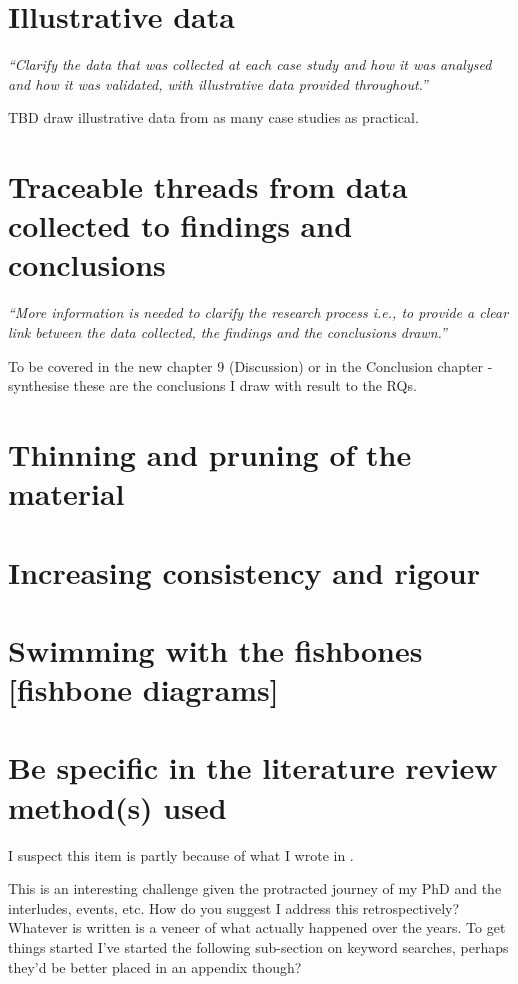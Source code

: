 \section{Illustrative data}
\emph{``Clarify the data that was collected at each case study and how it was analysed and how it was validated, with illustrative data provided throughout.''}

TBD draw illustrative data from as many case studies as practical.

\section{Traceable threads from data collected to findings and conclusions}
\emph{``More information is needed to clarify the research process i.e., to provide a clear link between the data collected, the findings and the conclusions drawn.''}

To be covered in the new chapter 9 (Discussion) or in the Conclusion chapter - synthesise these are the conclusions I draw with result to the RQs.

\section{Thinning and pruning of the material}

\section{Increasing consistency and rigour}

\section{Swimming with the fishbones [fishbone diagrams]}

\section{Be specific in the literature review method(s) used}
\begin{kaobox}

    I suspect this item is partly because of what I wrote in .
    
    This is an interesting challenge given the protracted journey of my PhD and the interludes, events, etc. How do you suggest I address this retrospectively? Whatever is written is a veneer of what actually happened over the years. To get things started I've started the following sub-section on keyword searches, perhaps they'd be better placed in an appendix though?
\end{kaobox}

